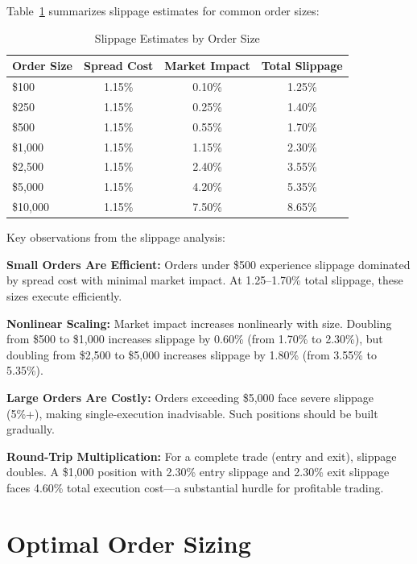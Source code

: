 Table~\ref{tab:slippage-table} summarizes slippage estimates for common order sizes:

\begin{table}[H]
\centering
\caption{Slippage Estimates by Order Size}
\label{tab:slippage-table}
\begin{tabular}{lccc}
\toprule
\textbf{Order Size} & \textbf{Spread Cost} & \textbf{Market Impact} & \textbf{Total Slippage} \\
\midrule
\$100 & 1.15\% & 0.10\% & 1.25\% \\
\$250 & 1.15\% & 0.25\% & 1.40\% \\
\$500 & 1.15\% & 0.55\% & 1.70\% \\
\$1,000 & 1.15\% & 1.15\% & 2.30\% \\
\$2,500 & 1.15\% & 2.40\% & 3.55\% \\
\$5,000 & 1.15\% & 4.20\% & 5.35\% \\
\$10,000 & 1.15\% & 7.50\% & 8.65\% \\
\bottomrule
\end{tabular}
\end{table}

Key observations from the slippage analysis:

\textbf{Small Orders Are Efficient:} Orders under \$500 experience slippage dominated by spread cost with minimal market impact. At 1.25--1.70\% total slippage, these sizes execute efficiently.

\textbf{Nonlinear Scaling:} Market impact increases nonlinearly with size. Doubling from \$500 to \$1,000 increases slippage by 0.60\% (from 1.70\% to 2.30\%), but doubling from \$2,500 to \$5,000 increases slippage by 1.80\% (from 3.55\% to 5.35\%).

\textbf{Large Orders Are Costly:} Orders exceeding \$5,000 face severe slippage (5\%+), making single-execution inadvisable. Such positions should be built gradually.

\textbf{Round-Trip Multiplication:} For a complete trade (entry and exit), slippage doubles. A \$1,000 position with 2.30\% entry slippage and 2.30\% exit slippage faces 4.60\% total execution cost---a substantial hurdle for profitable trading.

\section{Optimal Order Sizing}

